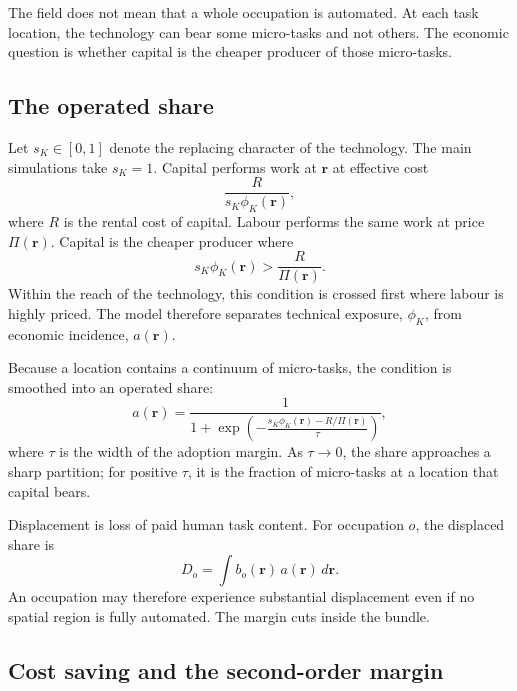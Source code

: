 \documentclass[12pt, a4paper]{article}
\begin{document}
The field does not mean that a whole occupation is automated. At each
task location, the technology can bear some micro-tasks and not others.
The economic question is whether capital is the cheaper producer of
those micro-tasks.

\subsection{The operated share}
\label{sec:operated-share}

Let $s_K \in [0,1]$ denote the replacing character of the technology.
The main simulations take $s_K=1$. Capital performs work at
$\mathbf{r}$ at effective cost
\[
  \frac{R}{s_K\phi_K(\mathbf{r})},
\]
where $R$ is the rental cost of capital. Labour performs the same work
at price $\Pi(\mathbf{r})$. Capital is the cheaper producer where
\begin{equation}
  s_K\phi_K(\mathbf{r})
  >
  \frac{R}{\Pi(\mathbf{r})}.
  \label{eq:regime-shift}
\end{equation}
Within the reach of the technology, this condition is crossed first
where labour is highly priced. The model therefore separates technical
exposure, $\phi_K$, from economic incidence, $a(\mathbf{r})$.

Because a location contains a continuum of micro-tasks, the condition is
smoothed into an operated share:
\begin{equation}
  a(\mathbf{r})
  =
  \frac{
    1
  }{
    1+
    \exp
    \left(
      -
      \frac{
        s_K\phi_K(\mathbf{r}) - R/\Pi(\mathbf{r})
      }{\tau}
    \right)
  },
  \label{eq:soft-switch}
\end{equation}
where $\tau$ is the width of the adoption margin. As $\tau \to 0$, the
share approaches a sharp partition; for positive $\tau$, it is the
fraction of micro-tasks at a location that capital bears.

Displacement is loss of paid human task content. For occupation $o$,
the displaced share is
\begin{equation}
  D_o
  =
  \int b_o(\mathbf{r})\,a(\mathbf{r})\,d\mathbf{r}.
  \label{eq:displaced}
\end{equation}
An occupation may therefore experience substantial displacement even if
no spatial region is fully automated. The margin cuts inside the bundle.

\subsection{Cost saving and the second-order margin}
\label{sec:cost-saving}
\end{document}
